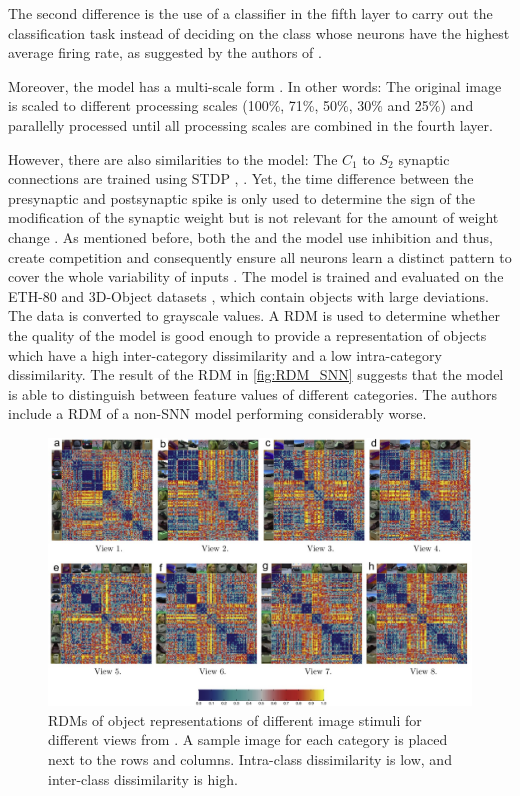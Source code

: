 The second difference is the use of a classifier in the fifth layer to carry out the classification task instead of deciding on the class whose neurons have the highest average firing rate, 
as suggested by the authors of \cite{SNN}.

Moreover, the model has a multi-scale form \cite{multi_scale_STDP}.
In other words: 
The original image is scaled to different processing scales (100\%, 71\%, 50\%, 30\% and 25\%) and parallelly processed until all processing scales are combined in the fourth layer.

However, there are also similarities to the \cite{SNN} model:
The $C_1$ to $S_2$ synaptic connections are trained using \ac{STDP} \cite{multi_scale_STDP}, \cite{STDP_vis_feat}.
Yet, the time difference between the presynaptic and postsynaptic spike is only used to determine the sign of the modification of the synaptic weight 
but is not relevant for the amount of weight change \cite{STDP_vis_feat}.
As mentioned before, both the \cite{multi_scale_STDP} and the \cite{SNN} model use inhibition and thus, 
create competition and consequently ensure all neurons learn a distinct pattern to cover the whole variability of inputs \cite{STDP_vis_feat}.
%
The \cite{multi_scale_STDP} model is trained and evaluated on the ETH-80 and 3D-Object datasets \cite{multi_scale_STDP}, which contain objects with large deviations.
The data is converted to grayscale values.
A \ac{RDM} is used to determine whether the quality of the model is good enough to provide a representation of objects which have a high inter-category dissimilarity and a low intra-category dissimilarity.
The result of the \ac{RDM} in \autoref{fig:RDM_SNN} suggests that the model is able to distinguish between feature values of different categories.
The authors include a \ac{RDM} of a non-\ac{SNN} model performing considerably worse.
%
\begin{figure}[htbp]
    \center
    \includegraphics[width=\textwidth]{pictures/inter_intra_category_dissimilarity.jpg}
    \caption{\acp{RDM} of object representations of different image stimuli for different views from \cite{multi_scale_STDP}.
    A sample image for each category is placed next to the rows and columns.
    Intra-class dissimilarity is low, and inter-class dissimilarity is high.}
    \label{fig:RDM_SNN}
\end{figure}
